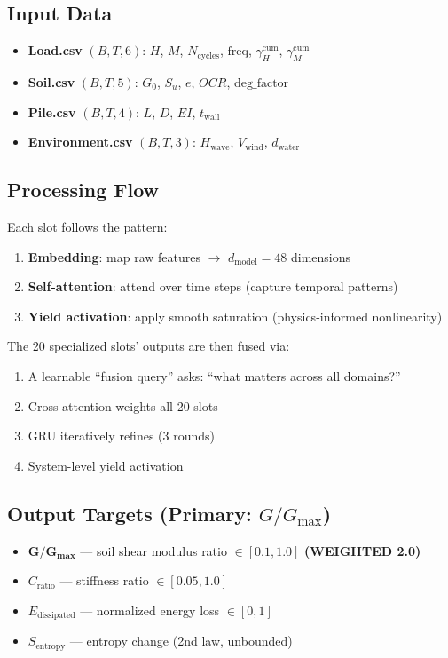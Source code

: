 \documentclass[12pt,a4paper]{article}
\begin{document}
\subsection{Input Data}

\begin{itemize}
  \item \textbf{Load.csv} $(B,T,6)$: $H$, $M$, $N_{\text{cycles}}$, $\text{freq}$, $\gamma_H^{\text{cum}}$, $\gamma_M^{\text{cum}}$
  \item \textbf{Soil.csv} $(B,T,5)$: $G_0$, $S_u$, $e$, $OCR$, $\text{deg\_factor}$
  \item \textbf{Pile.csv} $(B,T,4)$: $L$, $D$, $EI$, $t_{\text{wall}}$
  \item \textbf{Environment.csv} $(B,T,3)$: $H_{\text{wave}}$, $V_{\text{wind}}$, $d_{\text{water}}$
\end{itemize}

\subsection{Processing Flow}

Each slot follows the pattern:
\begin{enumerate}
  \item \textbf{Embedding}: map raw features $\to$ $d_{\text{model}}=48$ dimensions
  \item \textbf{Self-attention}: attend over time steps (capture temporal patterns)
  \item \textbf{Yield activation}: apply smooth saturation (physics-informed nonlinearity)
\end{enumerate}

The 20 specialized slots' outputs are then fused via:
\begin{enumerate}
  \item A learnable ``fusion query'' asks: ``what matters across all domains?''
  \item Cross-attention weights all 20 slots
  \item GRU iteratively refines (3 rounds)
  \item System-level yield activation
\end{enumerate}

\subsection{Output Targets (Primary: $G/G_{\max}$)}

\begin{itemize}
  \item $\mathbf{G/G_{\max}}$ — soil shear modulus ratio $\in [0.1, 1.0]$ \quad \textbf{(WEIGHTED 2.0)}
  \item $C_{\text{ratio}}$ — stiffness ratio $\in [0.05, 1.0]$
  \item $E_{\text{dissipated}}$ — normalized energy loss $\in [0, 1]$
  \item $S_{\text{entropy}}$ — entropy change (2nd law, unbounded)
\end{itemize}
\end{document}
